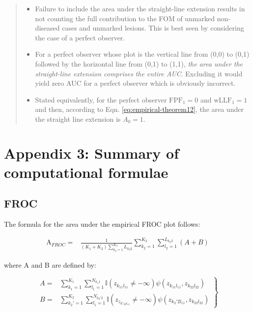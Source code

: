 \documentclass[
]{book}
\providecommand{\tightlist}{%
  \setlength{\itemsep}{0pt}\setlength{\parskip}{0pt}}
\begin{document}
\begin{quote}
\begin{itemize}
\tightlist
\item
  Failure to include the area under the straight-line extension results in not counting the full contribution to the FOM of unmarked non-diseased cases and unmarked lesions. This is best seen by considering the case of a perfect observer.
\item
  For a perfect observer whose plot is the vertical line from (0,0) to (0,1) followed by the horizontal line from (0,1) to (1,1), \emph{the area under the straight-line extension comprises the entire AUC}. Excluding it would yield zero AUC for a perfect observer which is obviously incorrect.
\item
  Stated equivalently, for the perfect observer \(\text{FPF}_1 = 0\) and \(\text{wLLF}_1 = 1\) and then, according to Eqn. \eqref{eq:empirical-theorem12}, the area under the straight line extension is \(A_0 = 1\).
\end{itemize}
\end{quote}

\hypertarget{empirical-summary-computational-formulae}{%
\section{Appendix 3: Summary of computational formulae}\label{empirical-summary-computational-formulae}}

\hypertarget{froc}{%
\subsection{FROC}\label{froc}}

The formula for the area under the empirical FROC plot follows:

\begin{equation}
\begin{aligned}
\text{A}_{FROC} =& \frac{1}{\left ( K_1+K_2 \right )\sum_{k_2=1}^{K_2}L_{k_2 2}}\sum_{k_2=1}^{K_2}\sum_{l_2=1}^{L_{k_2 2}} \left( A+B \right)
\end{aligned}
\label{eq:empirical-computational-froc}
\end{equation}

where A and B are defined by:

\begin{equation}
\left. 
\begin{aligned}
A =& \sum_{k_1=1}^{K_1}\sum_{l_1=1}^{N_{k_1 1}} \mathbb{I} \left ( z_{k_11l_11} \neq  -\infty \right ) \psi\left ( z_{k_11l_11},z_{k_22l_22} \right )\\
B =&\sum_{k_2'=1}^{K_2}\sum_{l_1=1}^{N_{k_2' 2}} \mathbb{I} \left ( z_{z_{k'_22l_11}} \neq  -\infty \right )\psi\left ( z_{k_2'2l_11},z_{k_22l_22} \right )
\end{aligned}
\right \} 
\label{eq:empirical-computational-froc-ab-terms}
\end{equation}
\end{document}
